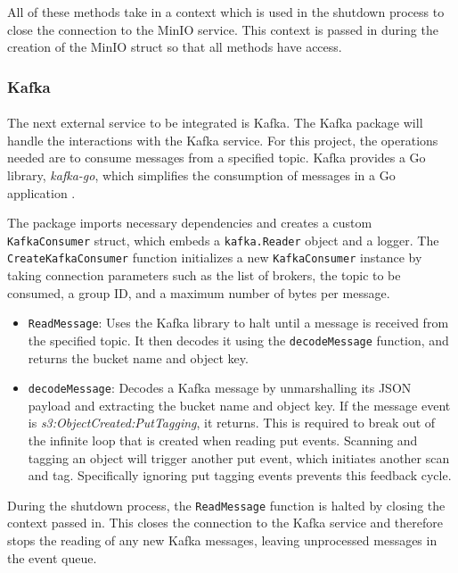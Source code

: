 \documentclass[12pt, conference, final, a4paper, onecolumn, compsoc]{IEEEtran}
\begin{document}
All of these methods take in a context which is used in the shutdown process to
close the connection to the MinIO service. This context is passed in during the
creation of the MinIO struct so that all methods have access.

\subsubsection*{Kafka}
\paragraph{}

The next external service to be integrated is Kafka. The Kafka package will
handle the interactions with the Kafka service. For this project, the operations
needed are to consume messages from a specified topic. Kafka provides a Go
library, \textit{kafka-go}, which simplifies the consumption of messages in a Go
application \citep{kafka-go-repo}.

The package imports necessary dependencies and creates a custom
\texttt{KafkaConsumer} struct, which embeds a \texttt{kafka.Reader} object and a
logger. The \texttt{CreateKafkaConsumer} function initializes a new
\texttt{KafkaConsumer} instance by taking connection parameters such as the list
of brokers, the topic to be consumed, a group ID, and a maximum number of bytes
per message.

\begin{itemize}
  \item \texttt{ReadMessage}: Uses the Kafka library to halt until a message is
        received from the specified topic. It then decodes it using the
        \texttt{decodeMessage} function, and returns the bucket name and object
        key.
  \item \texttt{decodeMessage}: Decodes a Kafka message by unmarshalling its
        JSON payload and extracting the bucket name and object key. If the
        message event is \textit{s3:ObjectCreated:PutTagging}, it returns. This
        is required to break out of the infinite loop that is created when
        reading put events. Scanning and tagging an object will trigger another
        put event, which initiates another scan and tag. Specifically ignoring
        put tagging events prevents this feedback cycle.
\end{itemize}

During the shutdown process, the \texttt{ReadMessage} function is halted by
closing the context passed in. This closes the connection to the Kafka service
and therefore stops the reading of any new Kafka messages, leaving unprocessed
messages in the event queue.
\end{document}
